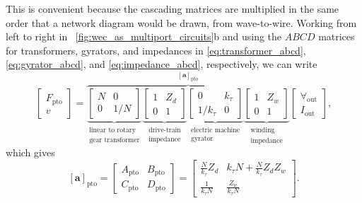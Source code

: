 \documentclass[lettersize,journal]{IEEEtran}
\begin{document}
%
This is convenient because the cascading matrices are multiplied in the same order that a network diagram would be drawn, from wave-to-wire.
Working from left to right in \figurename~\ref{fig:wec_as_multiport_circuits}b and using the $ABCD$ matrices for transformers, gyrators, and impedances in \eqref{eq:transformer_abcd}, \eqref{eq:gyrator_abcd}, and \eqref{eq:impedance_abcd}, respectively, we can write 
%
\begin{equation}
 	\label{eq:Z_cascade_to_ABCD}
 	\begin{bmatrix} 
 		F_{\textrm{pto}} \\
 		v 
 	\end{bmatrix} 
 	\! = \!
        \overbrace{
 	\underbrace{
        \begin{bmatrix} 
                N & 0 \\ 
                0 & 1/N 
        \end{bmatrix}
        }_{\substack{\text{linear to rotary} \\ \text{gear transformer}}}
        \underbrace{
  	\begin{bmatrix} 
	 	1 & Z_d \\ 
 		0 & 1 
	\end{bmatrix}
        }_{\substack{\text{drive-train} \\ \text{impedance}}}
        \underbrace{
   	\begin{bmatrix} 
	 	0 & k_{\tau} \\ 
	 	1/k_{\tau} & 0 
        \end{bmatrix}
        }_{\substack{\text{electric machine} \\ \text{gyrator}}}
        \underbrace{
   	\begin{bmatrix} 
	 	1 & Z_w \\ 
	 	0 & 1 
	\end{bmatrix}
        }_{\substack{\text{winding} \\ \text{impedance}}}
        }^{\left[ \mathbf{a} \right]_{\textrm{pto}}}
 	\begin{bmatrix} 
 		\forall_{\textrm{out}} \\
 		I_{\textrm{out}} 
 	\end{bmatrix} \!, 
\end{equation}
%
which gives
%
\begin{equation}
        \left[ \mathbf{a} \right]_{\textrm{pto}}
	= 
	\begin{bmatrix} 
		A_{\textrm{pto}} & B_{\textrm{pto}} \\ 
		C_{\textrm{pto}} & D_{\textrm{pto}} 
	\end{bmatrix}
	=
	\begin{bmatrix} 
		\frac{N}{k_{\tau}}  Z_d & k_\tau N +\frac{N}{k_{\tau}}  Z_dZ_w  \\
		\frac{1}{k_{\tau}N}     & \frac{Z_w}{k_{\tau}N} 
	\end{bmatrix}.
	\label{eq:pto_abcd}
\end{equation}
\end{document}

